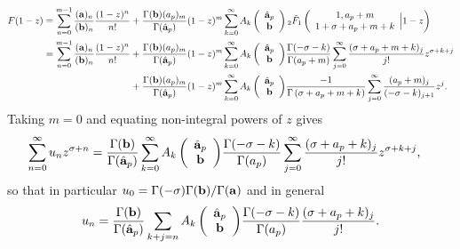 \documentclass[10pt]{article}
\numberwithin{equation}{section}
\begin{document}
\begin{align*}
F(1-z)=\sum_{n=0}^{m-1} \frac{(\bold a)_n}{(\bold b)_n}\frac{(1-z)^n}{n!}&+\frac{\Gamma(\bold{b})(a_p)_m}{\Gamma(\hat{\bold{a}}_p)} (1-z)^m \sum_{k=0}^{\infty} {A_k\left(\begin{array}{c} \hat{\bold{a}}_p \\ \bold{b} \end{array}\right)}\,{} _2\tilde{F}_1\left( \begin{array}{c} 1,a_p+m \\ 1+\sigma+a_p+m+k \end{array} \Big| 1-z\right)\\
=\sum_{n=0}^{m-1} \frac{(\bold a)_n}{(\bold b)_n}\frac{(1-z)^n}{n!}&+\frac{\Gamma(\bold{b})(a_p)_m}{\Gamma(\hat{\bold{a}}_p)} (1-z)^m \sum_{k=0}^{\infty} {A_k\left(\begin{array}{c} \hat{\bold{a}}_p \\ \bold{b} \end{array}\right)}\frac{\Gamma (-\sigma-k)}{\Gamma (a_p+m)} \sum_{j=0}^{\infty} \frac{(\sigma+a_p+m+k)_j}{j!}z^{\sigma+k+j}\\
&+\frac{\Gamma(\bold{b})(a_p)_m}{\Gamma(\hat{\bold{a}}_p)} (1-z)^m \sum_{k=0}^{\infty} {A_k\left(\begin{array}{c} \hat{\bold{a}}_p \\ \bold{b} \end{array}\right)} \frac{-1}{\Gamma
	\left(\sigma+a_p+m+k\right)} \sum_{j=0}^{\infty} \frac{(a_p+m)_j}{(-\sigma-k)_{j+1}} z^j.
\end{align*}
Taking $m=0$ and equating non-integral powers of $z$ gives
\begin{align*}
\sum_{n=0}^\infty u_n z^{\sigma + n} &= \frac{\Gamma(\bold{b})}{\Gamma(\hat{\bold{a}}_p)} \sum_{k=0}^{\infty} {A_k\left(\begin{array}{c} \hat{\bold{a}}_p \\ \bold{b} \end{array}\right)}\frac{\Gamma (-\sigma-k)}{\Gamma (a_p)} \sum_{j=0}^\infty \frac{(\sigma+a_p+k)_j}{j!} z^{\sigma+k+j}\text{,}
\end{align*}
so that in particular $u_0=\Gamma(-\sigma)\Gamma(\bold b) / \Gamma (\bold a)$ and in general
\begin{align*}
u_n=\frac{\Gamma(\bold{b})}{\Gamma(\hat{\bold{a}}_p)} \sum_{k+j=n}{A_k\left(\begin{array}{c} \hat{\bold{a}}_p \\ \bold{b} \end{array}\right)}\frac{\Gamma (-\sigma-k)}{\Gamma (a_p)} \frac{(\sigma+a_p+k)_j}{j!}\text{.}
\end{align*}
\end{document}
